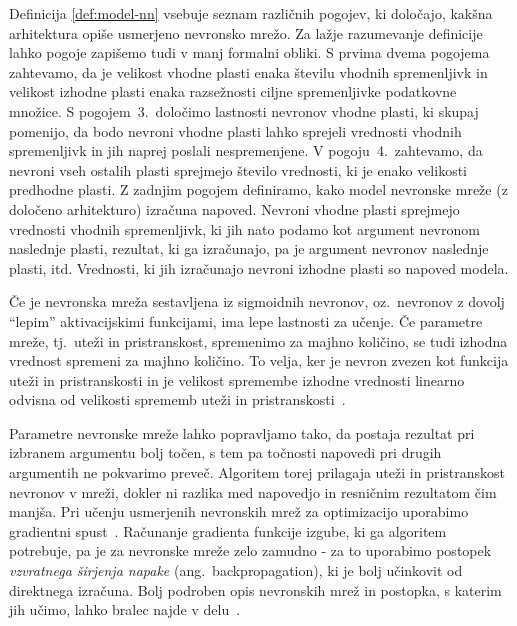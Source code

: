 \documentclass[12pt,a4paper,twoside]{article}
\theoremstyle{definition} %
\theoremstyle{plain} %
\numberwithin{equation}{section}  %
\begin{document}
Definicija \ref{def:model-nn} vsebuje seznam različnih pogojev, ki določajo, kakšna arhitektura opiše usmerjeno nevronsko mrežo. 
Za lažje razumevanje definicije lahko pogoje zapišemo tudi v manj formalni obliki.
S prvima dvema pogojema zahtevamo, da je velikost vhodne plasti enaka številu vhodnih spremenljivk in velikost izhodne plasti enaka razsežnosti ciljne spremenljivke podatkovne množice.
S pogojem~3.\ določimo lastnosti nevronov vhodne plasti, ki skupaj pomenijo, da bodo nevroni vhodne plasti lahko sprejeli vrednosti vhodnih spremenljivk in jih naprej poslali nespremenjene.
V pogoju~4.\ zahtevamo, da nevroni vseh ostalih plasti sprejmejo število vrednosti, ki je enako velikosti predhodne plasti.
Z zadnjim pogojem definiramo, kako model nevronske mreže (z določeno arhitekturo) izračuna napoved.
Nevroni vhodne plasti sprejmejo vrednosti vhodnih spremenljivk, ki jih nato podamo kot argument nevronom naslednje plasti, rezultat, ki ga izračunajo, pa je argument nevronov naslednje plasti, itd.
Vrednosti, ki jih izračunajo nevroni izhodne plasti so napoved modela.

Če je nevronska mreža sestavljena iz sigmoidnih nevronov, oz.~nevronov z dovolj ``lepim'' aktivacijskimi funkcijami, ima lepe lastnosti za učenje. 
Če parametre mreže, tj.~uteži in pristranskost, spremenimo za majhno količino, se tudi izhodna vrednost spremeni za majhno količino. 
To velja, ker je nevron zvezen kot funkcija uteži in pristranskosti in je velikost spremembe izhodne vrednosti linearno odvisna od velikosti sprememb uteži in pristranskosti~\cite[pogl.\ 1]{nielsen2015neural}.

Parametre nevronske mreže lahko popravljamo tako, da postaja rezultat pri izbranem argumentu bolj točen, s tem pa točnosti napovedi pri drugih argumentih ne pokvarimo preveč. 
Algoritem torej prilagaja uteži in pristranskost nevronov v mreži, dokler ni razlika med napovedjo in resničnim rezultatom čim manjša. 
Pri učenju usmerjenih nevronskih mrež za optimizacijo uporabimo gradientni spust~\cite[pogl.\ 1]{nielsen2015neural}.
Računanje gradienta funkcije izgube, ki ga algoritem potrebuje, pa je za nevronske mreže zelo zamudno - za to uporabimo postopek \emph{vzvratnega širjenja napake} (ang.~backpropagation), ki je bolj učinkovit od direktnega izračuna. 
Bolj podroben opis nevronskih mrež in postopka, s katerim jih učimo, lahko bralec najde v delu~\cite[pogl.\ 2]{nielsen2015neural}.
\end{document}
